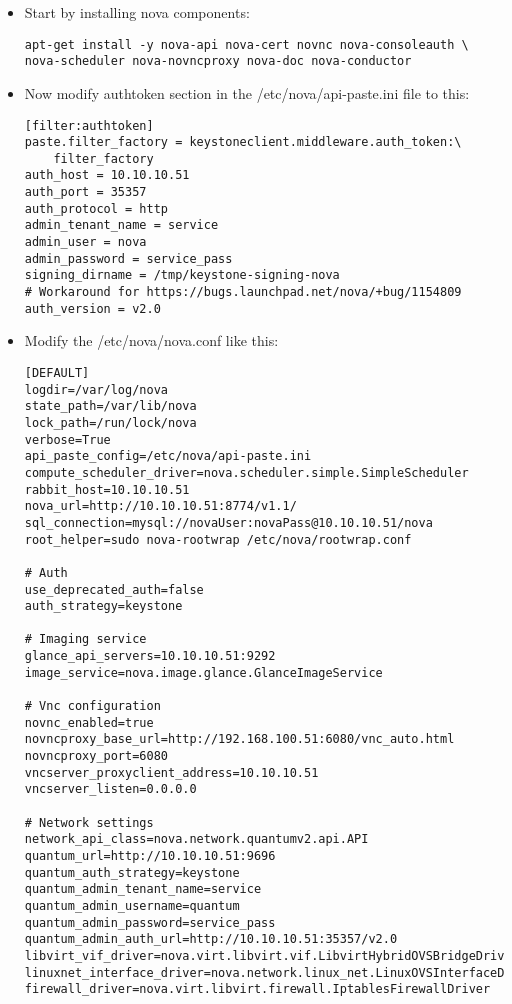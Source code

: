 \begin{itemize}
\item Start by installing nova components:

\begin{verbatim}
apt-get install -y nova-api nova-cert novnc nova-consoleauth \
nova-scheduler nova-novncproxy nova-doc nova-conductor
\end{verbatim}


\item Now modify authtoken section in the \slash etc\slash nova\slash api-paste.ini file to this:

\begin{verbatim}
[filter:authtoken]  
paste.filter_factory = keystoneclient.middleware.auth_token:\
    filter_factory  
auth_host = 10.10.10.51  
auth_port = 35357  
auth_protocol = http  
admin_tenant_name = service  
admin_user = nova  
admin_password = service_pass  
signing_dirname = /tmp/keystone-signing-nova  
# Workaround for https://bugs.launchpad.net/nova/+bug/1154809  
auth_version = v2.0
\end{verbatim}


\item Modify the \slash etc\slash nova\slash nova.conf like this:

\begin{verbatim}
[DEFAULT] 
logdir=/var/log/nova
state_path=/var/lib/nova
lock_path=/run/lock/nova
verbose=True
api_paste_config=/etc/nova/api-paste.ini
compute_scheduler_driver=nova.scheduler.simple.SimpleScheduler
rabbit_host=10.10.10.51
nova_url=http://10.10.10.51:8774/v1.1/
sql_connection=mysql://novaUser:novaPass@10.10.10.51/nova
root_helper=sudo nova-rootwrap /etc/nova/rootwrap.conf

# Auth
use_deprecated_auth=false
auth_strategy=keystone 

# Imaging service
glance_api_servers=10.10.10.51:9292
image_service=nova.image.glance.GlanceImageService

# Vnc configuration
novnc_enabled=true
novncproxy_base_url=http://192.168.100.51:6080/vnc_auto.html
novncproxy_port=6080
vncserver_proxyclient_address=10.10.10.51
vncserver_listen=0.0.0.0

# Network settings
network_api_class=nova.network.quantumv2.api.API
quantum_url=http://10.10.10.51:9696
quantum_auth_strategy=keystone
quantum_admin_tenant_name=service
quantum_admin_username=quantum
quantum_admin_password=service_pass
quantum_admin_auth_url=http://10.10.10.51:35357/v2.0
libvirt_vif_driver=nova.virt.libvirt.vif.LibvirtHybridOVSBridgeDriver
linuxnet_interface_driver=nova.network.linux_net.LinuxOVSInterfaceDriver
firewall_driver=nova.virt.libvirt.firewall.IptablesFirewallDriver


\end{verbatim}
\end{itemize}
